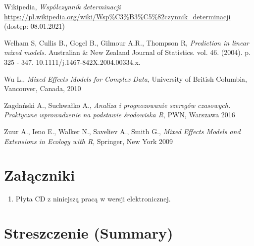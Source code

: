 \documentclass[12pt]{mwbk}
\theoremstyle{plain}
\theoremstyle{definition}
\theoremstyle{definition}
\begin{document}
\begin{thebibliography}{99}
 Wikipedia, \emph{Współczynnik determinacji} \url{https://pl.wikipedia.org/wiki/Wsp\%C3\%B3\%C5\%82czynnik\_determinacji} (dostęp: 08.01.2021)

 Welham S, Cullis B., Gogel B.,  Gilmour A.R.,  Thompson R, \emph{Prediction in linear mixed models.} Australian \& New Zealand Journal of Statistics. vol. 46.  (2004). p.  325 - 347. 10.1111/j.1467-842X.2004.00334.x. 

 Wu L., \emph{Mixed Effects Models for Complex Data}, University of British Columbia, Vancouver, Canada, 2010

 Zagdański A., Suchwałko A., \emph{Analiza i prognozowanie szeregów czasowych. Praktyczne wprowadzenie na podstawie środowiska R}, PWN, Warszawa 2016

 Zuur A., Ieno E., Walker N.,
Saveliev A., Smith G., \emph{Mixed Effects Models and Extensions in Ecology with R}, Springer, New York 2009




\end{thebibliography}



\listoffigures

\listoftables


\chapter*{Załączniki}
\begin{enumerate}
\item Płyta CD z niniejszą pracą w wersji elektronicznej.
\end{enumerate}




\chapter*{Streszczenie (Summary)}

\bigskip
\bigskip

\begin{center}
  \textbf{\tytul}
\end{center}
\end{document}
